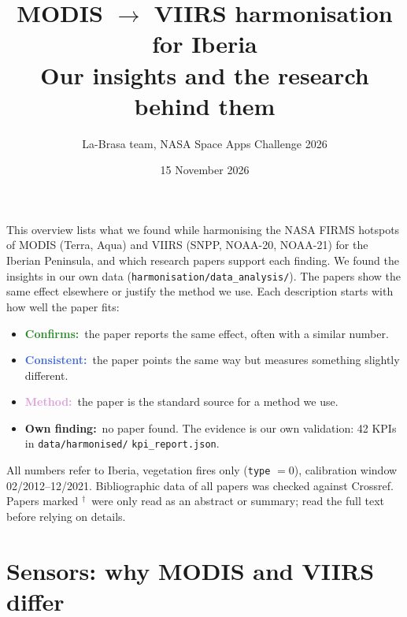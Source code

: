 \documentclass[10pt,a4paper]{article}
\title{\textbf{MODIS $\rightarrow$ VIIRS harmonisation for Iberia}\\[2pt]
       \large Our insights and the research behind them}
\author{La-Brasa team, NASA Space Apps Challenge 2026}
\date{15 November 2026}
\newcommand{\fitlabel}[2]{\textcolor{#1}{\textbf{#2}}}
\newcommand{\confirms}{\fitlabel{ForestGreen}{Confirms:}}
\newcommand{\consistent}{\fitlabel{RoyalBlue}{Consistent:}}
\newcommand{\method}{\fitlabel{Plum}{Method:}}
\newcommand{\own}{\fitlabel{BurntOrange}{Own finding:}}
\newcommand{\abs}{$^\dagger$}   %
\begin{document}
\maketitle

\noindent
This overview lists what we found while harmonising the NASA FIRMS hotspots of MODIS (Terra, Aqua) and VIIRS
(SNPP, NOAA-20, NOAA-21) for the Iberian Peninsula, and which research papers support each finding.
We found the insights in our own data (\texttt{harmonisation/data\_analysis/}). The papers show the same effect
elsewhere or justify the method we use. Each description starts with how well the paper fits:

\begin{itemize}[nosep,leftmargin=1.5em]
  \item \confirms\ the paper reports the same effect, often with a similar number.
  \item \consistent\ the paper points the same way but measures something slightly different.
  \item \method\ the paper is the standard source for a method we use.
  \item \own\ no paper found. The evidence is our own validation: 42 KPIs in
        \texttt{data/harmonised/} \texttt{kpi\_report.json}.
\end{itemize}

\medskip\noindent
All numbers refer to Iberia, vegetation fires only (\texttt{type} $= 0$), calibration window 02/2012--12/2021.
Bibliographic data of all papers was checked against Crossref. Papers marked \abs\ were only read as an abstract
or summary; read the full text before relying on details.

\section{Sensors: why MODIS and VIIRS differ}
\end{document}
